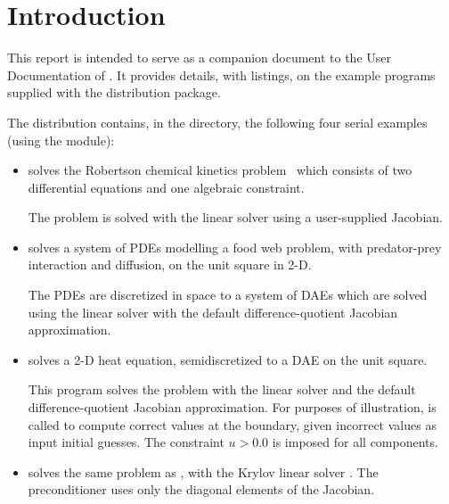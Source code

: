 \section{Introduction}\label{s:ex_intro}

This report is intended to serve as a companion document to the User
Documentation of {\ida} \cite{ida2.2.0_ug}.  It provides details, with
listings, on the example programs supplied with the {\ida} distribution
package.

The {\ida} distribution contains, in the 
directory, the following four serial examples (using the {\nvecs} module):
\begin{itemize}

\item {}
  solves the Robertson chemical kinetics problem~\cite{Rob:66} which consists
  of two differential equations and one algebraic constraint.

  The problem is solved with the {\idadense} linear solver using
  a user-supplied Jacobian.

\item {}
  solves a system of PDEs modelling a food web problem, with predator-prey
  interaction and diffusion, on the unit square in 2-D.

  The PDEs are discretized in space to a system of DAEs which are solved
  using the {\idaband} linear solver with the default difference-quotient 
  Jacobian approximation.

\item {}
  solves a 2-D heat equation, semidiscretized to a DAE on the unit square.

  This program solves the problem with the {\idaband} linear solver and
  the default difference-quotient Jacobian approximation. For purposes of
  illustration,  is called to compute correct values at the
  boundary, given incorrect values as input initial guesses. The constraint
  $u > 0.0$ is imposed for all components.

\item {}
  solves the same problem as , with the Krylov linear solver
  {\idaspgmr}. The preconditioner uses only the diagonal elements of the 
  Jacobian.

\end{itemize}

